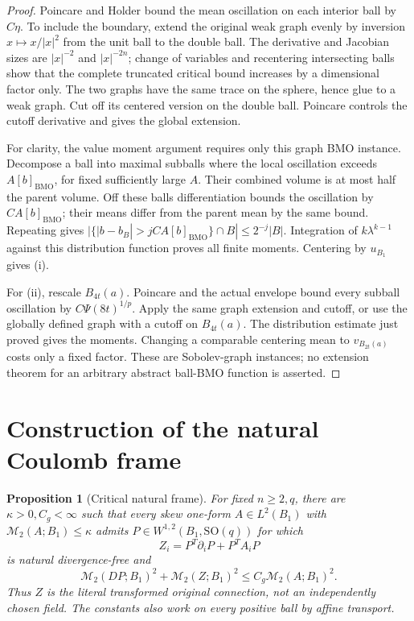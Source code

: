\documentclass[11pt,a4paper]{article}
\numberwithin{equation}{section}
\newtheorem{proposition}[theorem]{Proposition}
\theoremstyle{definition}
\theoremstyle{remark}
\newcommand{\SO}{\mathrm{SO}}
\newcommand{\BMO}{\mathrm{BMO}}
\newcommand{\M}{\mathcal M}
\begin{document}
\begin{proof}
Poincare and Holder bound the mean oscillation on each interior ball
by $C\eta$. To include the boundary, extend the original weak graph
evenly by inversion $x\mapsto x/|x|^2$ from the unit ball to the double
ball. The derivative and Jacobian sizes are $|x|^{-2}$ and $|x|^{-2n}$;
change of variables and recentering intersecting balls show that the
complete truncated critical bound increases by a dimensional factor
only. The two graphs have the same trace on the sphere, hence glue to
a weak graph. Cut off its centered version on the double ball.
Poincare controls the cutoff derivative and gives the global extension.

For clarity, the value moment argument requires only this graph BMO
instance. Decompose a ball into maximal subballs where the local
oscillation exceeds $A[b]_{\BMO}$, for fixed sufficiently large $A$.
Their combined volume is at most half the parent volume. Off these
balls differentiation bounds the oscillation by $C A[b]_{\BMO}$;
their means differ from the parent mean by the same bound. Repeating
gives
$|\{|b-b_B|>jC A[b]_{\BMO}\}\cap B|\leq2^{-j}|B|$.
Integration of $k\lambda^{k-1}$ against this distribution function
proves all finite moments. Centering by $u_{B_1}$ gives (i).

For (ii), rescale $B_{4t}(a)$. Poincare and the actual envelope bound
every subball oscillation by $C\Psi(8t)^{1/p}$. Apply the same graph
extension and cutoff, or use the globally defined graph with a cutoff
on $B_{4t}(a)$. The distribution estimate just proved gives the moments.
Changing a comparable centering mean to $v_{B_{2t}(a)}$ costs only a
fixed factor. These are Sobolev-graph instances; no extension theorem
for an arbitrary abstract ball-BMO function is asserted.
\end{proof}

\section{Construction of the natural Coulomb frame}\label{sec:gauge}
\begin{proposition}[Critical natural frame]\label{prop:gauge}
For fixed $n\geq2,q$, there are $\kappa>0,C_g<\infty$ such that
every skew one-form $A\in L^2(B_1)$ with $\M_2(A;B_1)\leq\kappa$
admits $P\in W^{1,2}(B_1,\SO(q))$ for which
\begin{equation}\label{eq:Z}
 Z_i=P^T\partial_iP+P^TA_iP
\end{equation}
is natural divergence-free and
\begin{equation}\label{eq:gauge-bound}
 \M_2(DP;B_1)^2+\M_2(Z;B_1)^2\leq C_g\M_2(A;B_1)^2.
\end{equation}
Thus $Z$ is the literal transformed original connection, not an
independently chosen field. The constants also work on every positive
ball by affine transport.
\end{proposition}
\end{document}
